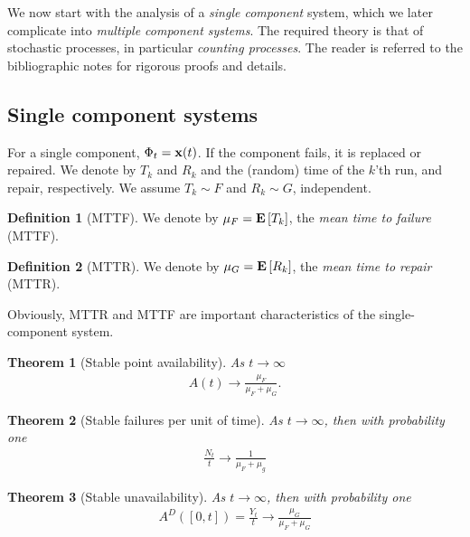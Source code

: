 \documentclass[12pt,a4paper]{report}
\theoremstyle{plain}
\newtheorem{theorem}{Theorem}[section]
\theoremstyle{definition}
\newtheorem{definition}{Definition}
\begin{document}
We now start with the analysis of a \emph{single component} system, which we later complicate into \emph{multiple component systems}. 
The required theory is that of stochastic processes, in particular \emph{counting processes}. 
The reader is referred to the bibliographic notes for rigorous proofs and details. 

\subsection{Single component systems}
For a single component, $\Phi_t=\mathbf{x}(t)$. 
If the component fails, it is replaced or repaired. 
We denote by $T_k$ and $R_k$ and the (random) time of the $k$'th run, and repair, respectively.
We assume $T_k \sim F$ and $R_k \sim G$, independent.

\begin{definition}[MTTF]
We denote by $\mu_F=\mathbf{E}\left[ T_k \right]$, the \emph{mean time to failure} (MTTF).
\end{definition}


\begin{definition}[MTTR]
We denote by $\mu_G=\mathbf{E}\left[ R_k \right]$, the \emph{mean time to repair} (MTTR).
\end{definition}

Obviously, MTTR and MTTF are important characteristics of the single-component system.


\begin{theorem}[Stable point availability]
As $t \to \infty$
\begin{align}
	A(t) \to \frac{\mu_F}{\mu_F+\mu_G}.
\end{align}
\end{theorem}

\begin{theorem}[Stable failures per unit of time]

As $t \to \infty$, then with probability one
\begin{align}
	\frac{N_t}{t} \to \frac{1}{\mu_F+\mu_g}
\end{align}
\end{theorem}

\begin{theorem}[Stable unavailability]
As $t \to \infty$, then with probability one
\begin{align}
	A^D([0,t])=\frac{Y_t}{t} \to \frac{\mu_G}{\mu_F+\mu_G} 
\end{align}

\end{theorem}
\end{document}
